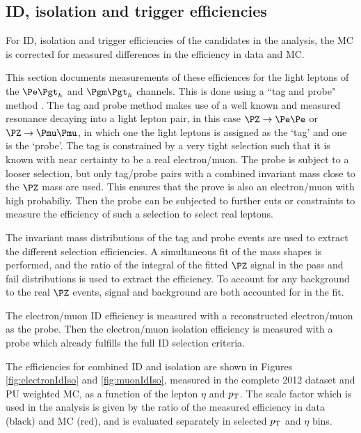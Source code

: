 \subsection{ID, isolation and trigger efficiencies}

For ID, isolation and
trigger efficiencies of the candidates in the analysis, the \ac{MC} is corrected
for measured differences in the efficiency in data and \ac{MC}.

This section documents measurements of these efficiences for the light leptons
of the $\etau$ and $\mutau$ channels. This is done using a ``tag and probe"
method \cite{Khachatryan:2010xn}.
The tag and probe method makes use of a well known and measured resonance decaying
into a light lepton pair, in this case $\PZ\to\Pe\Pe$ or $\PZ\to\Pmu\Pmu$, 
in which one the light leptons is assigned as the `tag' and one is the `probe'. 
The tag is constrained by a very tight selection such that it is known with near 
certainty to be a real electron/muon. The probe is subject to a looser selection, 
but only tag/probe pairs with a
combined invariant mass close to the $\PZ$ mass are used. This ensures that the
prove is also an electron/muon with high probabiliy. Then the probe can be 
subjected to further cuts or constraints to measure the efficiency of such a 
selection to select real leptons.

The invariant mass distributions of the tag and probe events are used to extract
the different
selection efficiencies. A simultaneous fit of the mass shapes is performed, and
the ratio of the integral of the fitted $\PZ$ signal in the pass and fail
distributions is used to extract the efficiency. To account for any background
to the real $\PZ$ events, signal and background are both accounted for in the
fit.

The electron/muon ID efficiency is measured with a reconstructed
electron/muon as the probe. Then the electron/muon isolation efficiency is measured
with a probe which already fulfills the full ID selection criteria. 

The efficiencies for combined ID and isolation are shown in Figures
\ref{fig:electronIdIso} and \ref{fig:muonIdIso}, measured in the complete 2012
dataset and PU weighted MC, as a function of the lepton $\eta$ and $p_{\mathrm{T}}$.
The scale factor which is used in the analysis is given by the ratio of the
measured efficiency in data (black) and MC (red), and is evaluated separately in
selected $p_{\mathrm{T}}$ and $\eta$ bins.


